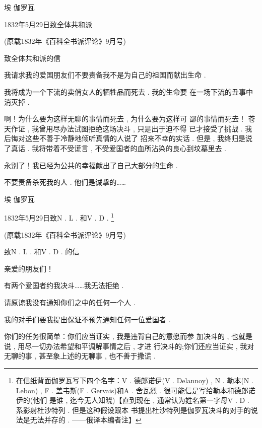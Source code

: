 \begin{flushright}
	埃 \textbullet 伽罗瓦
\end{flushright}

\begin{center}
	1832年5月29日致全体共和派

(原载1832年《百科全书派评论》9月号)
\end{center}

致全体共和派的信

我请求我的爱国朋友们不要责备我不是为自己的祖国而献出生命 . 

我将成为一个下流的卖俏女人的牺牲品而死去 . 我的生命要 在一场下流的丑事中消灭掉 . 


啊！为什么要为这样无聊的事情而死去 , 为什么要为这样可 鄙的事情而死去！
苍天作证 , 我曾用尽办法试图拒绝这场决斗 , 只是出于迫不得 已才接受了挑战 . 我后悔对这些不善于冷静地倾听真情的人说了 招来不幸的实话 . 但是 , 我终归是说了真话 . 我将带着不受谎言 ,  不受爱国者的血所沾染的良心到坟墓里去 . 

永别了！我已经为公共的幸福献出了自己大部分的生命 . 

不要责备杀死我的人 . 他们是诚挚的……

\begin{flushright}
	埃 \textbullet 伽罗瓦
\end{flushright}

\begin{flushright}
	1832年5月29日致N .  L . 和V .  D . \footnote{在信纸背面伽罗瓦写下四个名字：V . 德郎诺伊(V .  Delannoy) ,  N . 勒本(N .  Lebon) , F . 盖韦斯(F . Gervais)和A . 舍瓦烈 . 很可能信是写给勒本和德郎诺伊的(他们 是谁 , 迄今无人知晓)【直到现在 , 通常认为姓名第一字母V . D . 系影射杜沙特列 . 但是这种假设跟本 书提出杜沙特列是伽罗瓦决斗的对手的说法是无法并存的 . ——俄译本编者注】}

(原载1832年《百科全书派评论》9月号)
\end{flushright}

致N . L . 和V . D . 的信

亲爱的朋友们！

有两个爱国者约我决斗……我无法拒绝 . 

请原谅我没有通知你们之中的任何一个人 . 

我的对手们要我提出保证不预先通知任何一位爱国者 . 

你们的任务很简单：你们应当证实 , 我是违背自己的意愿而参 加决斗的 , 也就是说 , 用尽一切办法希望和平调解事情之后 , 才进 行决斗的;你们还应当证实 , 我对无聊的事 , 甚至象上述的无聊事 ,  也不善于撒谎 . 

